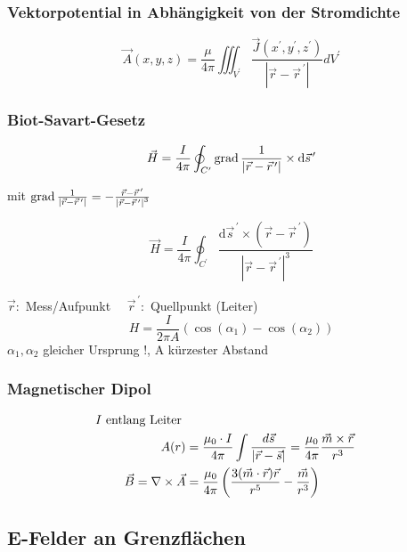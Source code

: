 \subsubsection{Vektorpotential in Abhängigkeit von der Stromdichte}
\[
    \vec{A}(x, y, z)=\frac{\mu}{4 \pi} \iiint_{V^{\prime}} \frac{\vec{J}\left(x^{\prime}, y^{\prime}, z^{\prime}\right)}{\left|\vec{r}-\vec{r}^{\,\prime}\right|} d V^{\prime}
\]

\subsubsection{Biot-Savart-Gesetz}
\[
    \vec{H}=\frac{I}{4 \pi} \oint_{C^{\prime}} \operatorname{grad} \frac{1}{\left|\vec{r}-\vec{r}^{\,\prime}\right|} \times \mathrm{d} \vec{s}^{\,\prime}
\]

mit $\operatorname{grad} \frac{1}{\left|\vec{r}-\vec{r}^{\,\prime}\right|}=-\frac{\vec{r}-\vec{r}^{\,\prime}}{\left|\vec{r}-\vec{r}^{\,\prime}\right|^{3}}$

\[
    \vec{H}=\frac{I}{4 \pi} \oint_{C^{\prime}} \frac{\mathrm{d} \vec{s}^{\,\prime} \times\left(\vec{r}-\vec{r}^{\,\prime}\right)}{\left|\vec{r}-\vec{r}^{\,\prime}\right|^{3}}
\]

{\footnotesize$\vec{r}:$ Mess/Aufpunkt $\quad \vec{r}^{\,\prime}:$ Quellpunkt (Leiter)}
\[
    H = \frac{I}{2 \pi A} ( \cos(\alpha_1) - \cos(\alpha_2))
\]
{\footnotesize$\alpha_1, \alpha_2$ gleicher Ursprung !, A kürzester Abstand}

\subsubsection{Magnetischer Dipol}


\begin{align*}
    I\textnormal{ entlang Leiter }                                                                                                                                        \\
    A(r)                            & = \frac{\mu_0 \cdot I}{4 \pi} \int \frac{d \vec{s}}{| \vec{r} - \vec{s}|} = \frac{ \mu_0}{4 \pi} \frac{\vec{m} \times \vec{r}}{r^3} \\
    \vec{B} = \nabla \times \vec{A} & = \frac{\mu_0}{4 \pi} \left(\frac{3(\vec{m} \cdot \vec{r})\vec{r}}{r^5} - \frac{\vec{m}}{r^3}\right)
\end{align*}

\newpage

\subsection{E-Felder an Grenzflächen}
